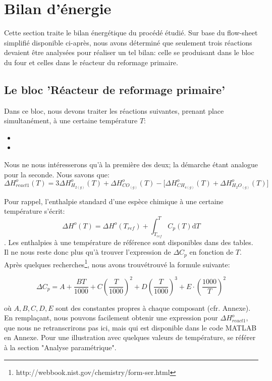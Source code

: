 \documentclass[11pt,a4paper]{report}
\author{Groupe 1246}
\begin{document}
\section*{Bilan d'énergie}

Cette section traite le bilan énergétique du procédé étudié.
Sur base du flow-sheet simplifié disponible ci-après, nous avons déterminé que seulement trois réactions
devaient être analysées pour réaliser un tel bilan: celle se produisant dans le bloc du four et celles dans 
le réacteur du reformage primaire.

\subsection*{Le bloc 'Réacteur de reformage primaire'}

Dans ce bloc, nous devons traiter les réactions suivantes, prenant place simultanément, à une certaine température $T$:

\begin{itemize}
\item{}
\item{}
\end{itemize}

\bigbreak
Nous ne nous intéresserons qu'à la première des deux; la démarche étant analogue pour la seconde. Nous savons que:
$$\Delta H^o_{react1}(T)=3\Delta H^o_{H_{2(g)}}(T) + \Delta H^o_{CO_{(g)}}(T) - \lbrack\Delta H^o_{CH_{4(g)}}(T) + 
\Delta H^o_{H_{2}O_{(g)}}(T)\rbrack$$

Pour rappel, l'enthalpie standard d'une espèce chimique à une certaine température s'écrit: 
$$\Delta H^o(T)=\Delta H^o(T_{ref})  + \displaystyle \int_{T_{ref}}^{T} C_{p}(T) \mathrm{d}T$$. Les enthalpies à
une température de référence sont disponibles dans des tables. Il ne nous reste donc plus qu'à trouver l'expression
de $\Delta C_p$ en fonction de $T$.
Après quelques recherches\footnote{http://webbook.nist.gov/chemistry/form-ser.html}, nous avons trouvétrouvé la formule suivante:

$$\Delta C_p=A+\dfrac{BT}{1000}+C\left(\dfrac{T}{1000}\right)^2+D\left(\dfrac{T}{1000}\right)^3+
E\cdot\left(\dfrac{1000}{T}\right)^2$$

où $A,B,C,D,E$ sont des constantes propres à chaque composant (cfr. Annexe).
En remplaçant, nous pouvons facilement obtenir une expression pour $\Delta H^o_{react1}$, que nous ne retranscrirons pas
ici, mais qui est disponible dans le code \textsc{MATLAB} en Annexe. Pour une illustration avec quelques valeurs de 
température, se référer à la section "Analyse paramétrique".
\end{document}
